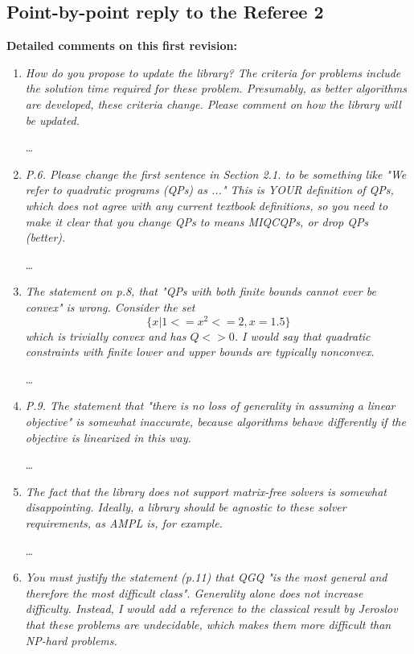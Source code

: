 \documentclass[11pt]{article}
\newcommand{\rep}[1]{{\textcolor{acblue}{#1}}}
\begin{document}
\subsection*{Point-by-point reply to the Referee 2}

\bigskip
\textbf{
Detailed comments on this first revision: 
}



 \begin{enumerate}
 
 
\item 
{\it
 How do you propose to update the library? The criteria for problems include 
the solution time required for these problem. Presumably, as better algorithms 
are developed, these criteria change. Please comment on how the library will 
be updated. 
}

\rep{\dots}

\item 
{\it
 P.6. Please change the first sentence in Section 2.1. to be something like 
"We refer to quadratic programs (QPs) as ..." This is YOUR definition of QPs, 
which does not agree with any current textbook definitions, so you need to 
make it clear that you change QPs to means MIQCQPs, or drop QPs (better). 
}

\rep{\dots}

\item 
{\it
 The statement on p.8, that "QPs with both finite bounds cannot ever be convex" 
is wrong. Consider the set $$\{ x | 1 <= x^2 <= 2, x=1.5\}$$ which is trivially 
convex and has $Q<>0$. I would say that quadratic constraints with finite lower 
and upper bounds are typically nonconvex. 
}

\rep{\dots}

\item 
{\it
 P.9. The statement that "there is no loss of generality in assuming a linear 
objective" is somewhat inaccurate, because algorithms behave differently if 
the objective is linearized in this way. 
}

\rep{\dots}

\item 
{\it
 The fact that the library does not support matrix-free solvers is somewhat 
disappointing. Ideally, a library should be agnostic to these solver requirements, 
as AMPL is, for example. 
}

\rep{\dots}

\item 
{\it
 You must justify the statement (p.11) that QGQ "is the most general and therefore 
the most difficult class". Generality alone does not increase difficulty. Instead, 
I would add a reference to the classical result by Jeroslov that these problems 
are undecidable, which makes them more difficult than NP-hard problems. 
}


\end{enumerate}
\end{document}
